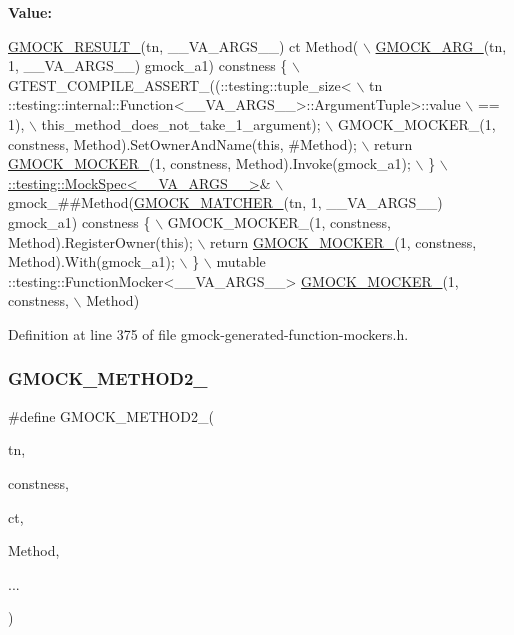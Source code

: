 {\bfseries Value\+:}
\begin{DoxyCode}
\hyperlink{gmock-generated-function-mockers_8h_a0e9d94e9c77df84f1103af06feee1077}{GMOCK\_RESULT\_}(tn, \_\_VA\_ARGS\_\_) ct Method( \(\backslash\)
      \hyperlink{gmock-generated-function-mockers_8h_a887575cc1c31158fba808180a10c004f}{GMOCK\_ARG\_}(tn, 1, \_\_VA\_ARGS\_\_) gmock\_a1) constness \{ \(\backslash\)
    GTEST\_COMPILE\_ASSERT\_((::testing::tuple\_size<                          \(\backslash\)
        tn ::testing::internal::Function<\_\_VA\_ARGS\_\_>::ArgumentTuple>::value \(\backslash\)
            == 1), \(\backslash\)
        this\_method\_does\_not\_take\_1\_argument); \(\backslash\)
    GMOCK\_MOCKER\_(1, constness, Method).SetOwnerAndName(\textcolor{keyword}{this}, #Method); \(\backslash\)
    return \hyperlink{gmock-generated-function-mockers_8h_a7d362499e27b1bc3a9806dd3cf58a5b7}{GMOCK\_MOCKER\_}(1, constness, Method).Invoke(gmock\_a1); \(\backslash\)
  \} \(\backslash\)
  \hyperlink{classtesting_1_1internal_1_1MockSpec}{::testing::MockSpec<\_\_VA\_ARGS\_\_>}& \(\backslash\)
      gmock\_##Method(\hyperlink{gmock-generated-function-mockers_8h_aa87d0009fe91f1c89d658776b55a769c}{GMOCK\_MATCHER\_}(tn, 1, \_\_VA\_ARGS\_\_) gmock\_a1) constness \{ \(\backslash\)
    GMOCK\_MOCKER\_(1, constness, Method).RegisterOwner(\textcolor{keyword}{this}); \(\backslash\)
    return \hyperlink{gmock-generated-function-mockers_8h_a7d362499e27b1bc3a9806dd3cf58a5b7}{GMOCK\_MOCKER\_}(1, constness, Method).With(gmock\_a1); \(\backslash\)
  \} \(\backslash\)
  mutable ::testing::FunctionMocker<\_\_VA\_ARGS\_\_> \hyperlink{gmock-generated-function-mockers_8h_a7d362499e27b1bc3a9806dd3cf58a5b7}{GMOCK\_MOCKER\_}(1, constness, \(\backslash\)
      Method)
\end{DoxyCode}


Definition at line 375 of file gmock-\/generated-\/function-\/mockers.\+h.

\mbox{\label{gmock-generated-function-mockers_8h_a885295ca6bebb15efb3fc786218c5d47}} 
\subsubsection{\texorpdfstring{G\+M\+O\+C\+K\+\_\+\+M\+E\+T\+H\+O\+D2\+\_\+}{GMOCK\_METHOD2\_}}
{\footnotesize\ttfamily \#define G\+M\+O\+C\+K\+\_\+\+M\+E\+T\+H\+O\+D2\+\_\+(\begin{DoxyParamCaption}\item[{}]{tn,  }\item[{}]{constness,  }\item[{}]{ct,  }\item[{}]{Method,  }\item[{}]{... }\end{DoxyParamCaption})}

